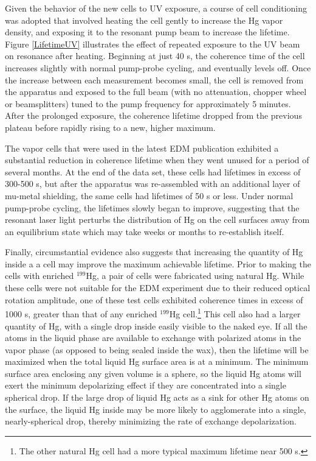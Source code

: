\documentclass [10pt, twoside] {uwthesis}[2012/04/02]
\begin{document}
Given the behavior of the new cells to UV exposure, a course of cell conditioning was adopted that involved heating the cell gently to increase the Hg vapor density, and exposing it to the resonant pump beam to increase the lifetime. Figure \ref{LifetimeUV} illustrates the effect of repeated exposure to the UV beam on resonance after heating. Beginning at just 40 s, the coherence time of the cell increases slightly with normal pump-probe cycling, and eventually levels off. Once the increase between each measurement becomes small, the cell is removed from the apparatus and exposed to the full beam (with no attenuation, chopper wheel or beamsplitters) tuned to the pump frequency for approximately 5 minutes. After the prolonged exposure, the coherence lifetime dropped from the previous plateau before rapidly rising to a new, higher maximum.

The vapor cells that were used in the latest EDM publication exhibited a substantial reduction in coherence lifetime when they went unused for a period of several months. At the end of the data set, these cells had lifetimes in excess of 300-500 s, but after the apparatus was re-assembled with an additional layer of mu-metal shielding, the same cells had lifetimes of 50 s or less. Under normal pump-probe cycling, the lifetimes slowly began to improve, suggesting that the resonant laser light perturbs the distribution of Hg on the cell surfaces away from an equilibrium state which may take weeks or months to re-establish itself.

Finally, circumstantial evidence also suggests that increasing the quantity of Hg inside a a cell may improve the maximum achievable lifetime. Prior to making the cells with enriched $^{199}$Hg, a pair of cells were fabricated using natural Hg. While these cells were not suitable for the EDM experiment due to their reduced optical rotation amplitude, one of these test cells exhibited coherence times in excess of 1000 s, greater than that of any enriched $^{199}$Hg cell.\footnote{The other natural Hg cell had a more typical maximum lifetime near 500 s.} This cell also had a larger quantity of Hg, with a single drop inside easily visible to the naked eye. If all the atoms in the liquid phase are available to exchange with polarized atoms in the vapor phase (as opposed to being sealed inside the wax), then the lifetime will be maximized when the total liquid Hg surface area is at a minimum. The minimum surface area enclosing any given volume is a sphere, so the liquid Hg atoms will exert the minimum depolarizing effect if they are concentrated into a single spherical drop. If the large drop of liquid Hg acts as a sink for other Hg atoms on the surface, the liquid Hg inside may be more likely to agglomerate into a single, nearly-spherical drop, thereby minimizing the rate of exchange depolarization.
\end{document}
